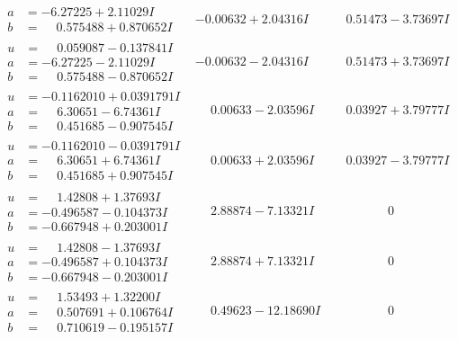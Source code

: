 \documentclass[1p]{elsarticle_modified}
\theoremstyle{definition}
\begin{document}
$$\begin{array}{c|c|c}
\begin{aligned}
a &= -6.27225 + 2.11029 I \\
b &= \phantom{-}0.575488 + 0.870652 I\end{aligned}
 & -0.00632 + 2.04316 I & \phantom{-}0.51473 - 3.73697 I \\ \hline\begin{aligned}
u &= \phantom{-}0.059087 - 0.137841 I \\
a &= -6.27225 - 2.11029 I \\
b &= \phantom{-}0.575488 - 0.870652 I\end{aligned}
 & -0.00632 - 2.04316 I & \phantom{-}0.51473 + 3.73697 I \\ \hline\begin{aligned}
u &= -0.1162010 + 0.0391791 I \\
a &= \phantom{-}6.30651 - 6.74361 I \\
b &= \phantom{-}0.451685 - 0.907545 I\end{aligned}
 & \phantom{-}0.00633 - 2.03596 I & \phantom{-}0.03927 + 3.79777 I \\ \hline\begin{aligned}
u &= -0.1162010 - 0.0391791 I \\
a &= \phantom{-}6.30651 + 6.74361 I \\
b &= \phantom{-}0.451685 + 0.907545 I\end{aligned}
 & \phantom{-}0.00633 + 2.03596 I & \phantom{-}0.03927 - 3.79777 I \\ \hline\begin{aligned}
u &= \phantom{-}1.42808 + 1.37693 I \\
a &= -0.496587 - 0.104373 I \\
b &= -0.667948 + 0.203001 I\end{aligned}
 & \phantom{-}2.88874 - 7.13321 I & \phantom{-0.000000 } 0 \\ \hline\begin{aligned}
u &= \phantom{-}1.42808 - 1.37693 I \\
a &= -0.496587 + 0.104373 I \\
b &= -0.667948 - 0.203001 I\end{aligned}
 & \phantom{-}2.88874 + 7.13321 I & \phantom{-0.000000 } 0 \\ \hline\begin{aligned}
u &= \phantom{-}1.53493 + 1.32200 I \\
a &= \phantom{-}0.507691 + 0.106764 I \\
b &= \phantom{-}0.710619 - 0.195157 I\end{aligned}
 & \phantom{-}0.49623 - 12.18690 I & \phantom{-0.000000 } 0 \\ \hline\begin{aligned}

\end{aligned}
\end{array}$$
\end{document}
